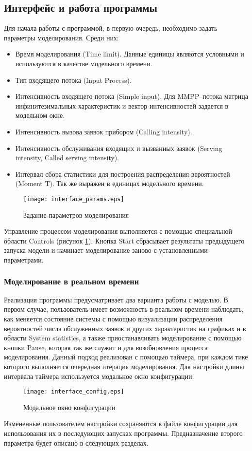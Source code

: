 \subsection{Интерфейс и работа программы}
Для начала работы с программой, в первую очередь, необходимо задать параметры моделирования. Среди них:
\begin{itemize}
	\item Время моделирования (Time limit). Данные единицы являются условными и используются в качестве модельного времени.
	\item Тип входящего потока (Input Process).
	\item Интенсивность входящего потока (Simple input). Для MMPP--потока матрица инфинитезимальных характеристик и вектор интенсивностей задается в модельном окне.
	\item Интенсивность вызова заявок прибором (Calling intensity).
	\item Интенсивность обслуживания входящих и вызванных заявок (Serving intensity, Called serving intensity).
	\item Интервал сбора статистики для построения распределения вероятностей (Moment T). Так же выражен в единицах модельного времени.
\end{itemize}
   \begin{figure}[H]
	\centering
	\texttt{[image: interface\_params.eps]}
	\caption{Задание параметров моделирования}
	\label{interface_params}
\end{figure}
Управление процессом моделирования выполняется с помощью специальной области Controls (рисунок \ref{interface_params}). Кнопка Start сбрасывает результаты предыдущего запуска модели и начинает моделирование заново с установленными параметрами.
\subsubsection{Моделирование в реальном времени}
Реализация программы предусматривает два варианта работы с моделью. В первом случае, пользователь имеет возможность в реальном времени наблюдать, как меняется состояние системы с помощью визуализации распределения вероятностей числа обслуженных заявок и других характеристик на графиках и в области System statistics, а также приостанавливать моделирование с помощью кнопки Pause, которая так же служит и для возобновления процесса моделирования. Данный подход реализован с помощью таймера, при каждом тике которого выполняется очередная итерация моделирования. Для настройки длины интервала таймера используется модальное окно конфигурации:
\begin{figure}[H]
	\centering
	\texttt{[image: interface\_config.eps]}
	\caption{Модальное окно конфигурации}
	\label{interface_config}
\end{figure}
Измененные пользователем настройки сохраняются в файле конфигурации для использования их в последующих запусках программы. Предназначение второго параметра будет описано в следующих разделах.


